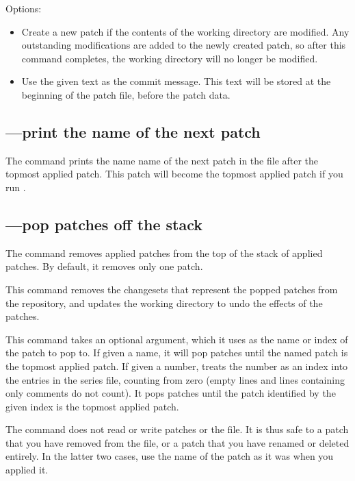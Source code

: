 Options:
\begin{itemize}
\item[\hgxopt{mq}{qnew}{-f}] Create a new patch if the contents of the
  working directory are modified.  Any outstanding modifications are
  added to the newly created patch, so after this command completes,
  the working directory will no longer be modified.
\item[\hgxopt{mq}{qnew}{-m}] Use the given text as the commit message.
  This text will be stored at the beginning of the patch file, before
  the patch data.
\end{itemize}

\subsection{---print the name of the next patch}

The  command prints the name name of the next patch in
the  file after the topmost applied patch.  This
patch will become the topmost applied patch if you run .

\subsection{---pop patches off the stack}

The  command removes applied patches from the top of the
stack of applied patches.  By default, it removes only one patch.

This command removes the changesets that represent the popped patches
from the repository, and updates the working directory to undo the
effects of the patches.

This command takes an optional argument, which it uses as the name or
index of the patch to pop to.  If given a name, it will pop patches
until the named patch is the topmost applied patch.  If given a
number,  treats the number as an index into the entries in
the series file, counting from zero (empty lines and lines containing
only comments do not count).  It pops patches until the patch
identified by the given index is the topmost applied patch.

The  command does not read or write patches or the
 file.  It is thus safe to  a patch that
you have removed from the  file, or a patch that you
have renamed or deleted entirely.  In the latter two cases, use the
name of the patch as it was when you applied it.


